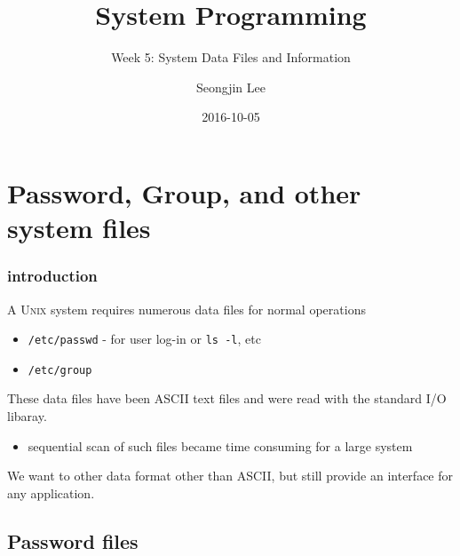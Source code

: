 \documentclass[newPxFont,sthlmFooter,nooffset]{beamer}
\title{System Programming}
\subtitle{Week 5: System Data Files and Information}
\author[SJL]{Seongjin Lee}
\institute{\href{mailto:insight@hanyang.ac.kr}{insight@hanyang.ac.kr}\\\url{http://esos.hanyang.ac.kr}\\Esos Lab. Hanyang University}
\date{2016-10-05}
\begin{document}
\frame[plain]{\titlepage} 




\section{Password, Group, and other system files}

\begin{frame}[t]
  \frametitle{introduction}
A \textsc{Unix} system requires numerous data files for normal operations
\begin{itemize}
\item \texttt{/etc/passwd} - for user log-in or \texttt{ls -l}, etc
\item \texttt{/etc/group} 
\end{itemize}

These data files have been ASCII text files and were read with the standard I/O libaray.

\begin{itemize}
\item sequential scan of such files became time consuming for a large system
\end{itemize}


We want to other data format other than ASCII, but still provide an interface for any application.

\end{frame}




\subsection{Password files}
\end{document}
